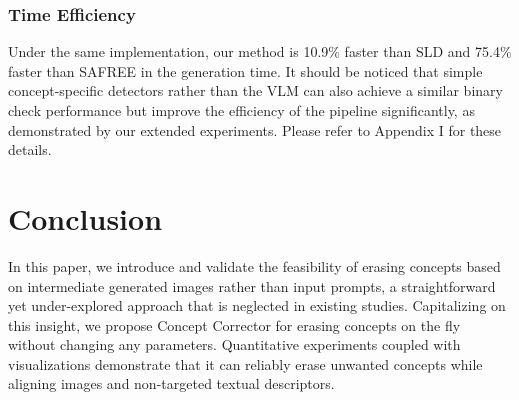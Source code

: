 \subsubsection{Time Efficiency}
Under the same implementation, our method is 10.9\% faster than SLD and 75.4\% faster than SAFREE in the generation time. It should be noticed that simple concept-specific detectors rather than the VLM can also achieve a similar binary check performance but improve the efficiency of the pipeline significantly, as demonstrated by our extended experiments. Please refer to Appendix I for these details.

\section{Conclusion}
\label{sec: conclusion}

In this paper, we introduce and validate the feasibility of erasing concepts based on intermediate generated images rather than input prompts, a straightforward yet under-explored approach that is neglected in existing studies. Capitalizing on this insight, we propose Concept Corrector for erasing concepts on the fly without changing any parameters. Quantitative experiments coupled with visualizations demonstrate that it can reliably erase unwanted concepts while aligning images and non-targeted textual descriptors.



